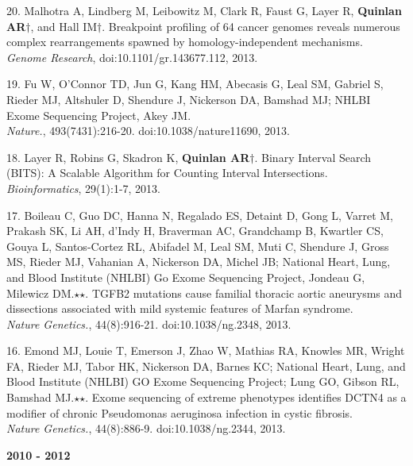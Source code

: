 \documentclass[margin,line]{cv}
\begin{document}
\begin{resume}
\begin{list}{*}{}
    \item[20.] Malhotra A, Lindberg M, Leibowitz M, Clark R, Faust G, Layer R, \textbf{Quinlan AR}$\dagger$, and Hall IM$\dagger$.
    Breakpoint profiling of 64 cancer genomes reveals numerous complex rearrangements spawned by homology-independent mechanisms. \\
    \emph{Genome Research}, doi:10.1101/gr.143677.112, 2013.

    \item[19.] Fu W, O'Connor TD, Jun G, Kang HM, Abecasis G, Leal SM, Gabriel S, Rieder MJ, Altshuler D, Shendure J, Nickerson DA, Bamshad MJ; NHLBI Exome Sequencing Project, Akey JM.\\
    \emph{Nature.}, 493(7431):216-20. doi:10.1038/nature11690, 2013.

    \item[18.] Layer R, Robins G, Skadron K, \textbf{Quinlan AR}$\dagger$.
    Binary Interval Search (BITS): A Scalable Algorithm for Counting Interval Intersections.\\
    \emph{Bioinformatics}, 29(1):1-7, 2013.

    \item[17.] Boileau C, Guo DC, Hanna N, Regalado ES, Detaint D, Gong L, Varret M, Prakash SK, Li AH, d'Indy H, Braverman AC, Grandchamp B, Kwartler CS, Gouya L, Santos-Cortez RL, Abifadel M, Leal SM, Muti C, Shendure J, Gross MS, Rieder MJ, Vahanian A, Nickerson DA, Michel JB; National Heart, Lung, and Blood Institute (NHLBI) Go Exome Sequencing Project, Jondeau G, Milewicz DM.$\star$$\star$. TGFB2 mutations cause familial thoracic aortic aneurysms and dissections associated with mild systemic features of Marfan syndrome.\\
    \emph{Nature Genetics.}, 44(8):916-21. doi:10.1038/ng.2348, 2013.

    \item[16.] Emond MJ, Louie T, Emerson J, Zhao W, Mathias RA, Knowles MR, Wright FA, Rieder MJ, Tabor HK, Nickerson DA, Barnes KC; National Heart, Lung, and Blood Institute (NHLBI) GO Exome Sequencing Project; Lung GO, Gibson RL, Bamshad MJ.$\star$$\star$. Exome sequencing of extreme phenotypes identifies DCTN4 as a modifier of chronic Pseudomonas aeruginosa infection in cystic fibrosis.\\
    \emph{Nature Genetics.}, 44(8):886-9. doi:10.1038/ng.2344, 2013.

    \end{list}

    \textbf{2010 - 2012} \\
    \begin{list}{*}{}


\end{list}
\end{resume}
\end{document}
